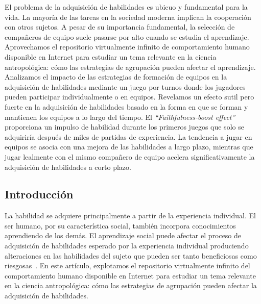 \documentclass[a4paper,10pt]{book}
\theoremstyle{definition}
\begin{document}
El problema de la adquisici\'on de habilidades es ubicuo y fundamental para la vida.
%
La mayor\'ia de las tareas en la sociedad moderna implican la cooperaci\'on con otros sujetos.
%
A pesar de su importancia fundamental, la selecci\'on de compañeros de equipo suele pasarse por alto cuando se estudia el aprendizaje.
%
Aprovechamos el repositorio virtualmente infinito de comportamiento humano disponible en Internet para estudiar un tema relevante en la ciencia antropol\'ogica: c\'omo las estrategias de agrupaci\'on pueden afectar el aprendizaje.
%
Analizamos el impacto de las estrategias de formaci\'on de equipos en la adquisici\'on de habilidades mediante un juego por turnos donde los jugadores pueden participar individualmente o en equipos.
%
Revelamos un efecto sutil pero fuerte en la adquisici\'on de habilidades basado en la forma en que se forman y mantienen los equipos a lo largo del tiempo.
%
El \emph{``Faithfulness-boost effect''} proporciona un impulso de habilidad durante los primeros juegos que solo se adquirir\'ia después de miles de partidas de experiencia.
%
La tendencia a jugar en equipos se asocia con una mejora de las habilidades a largo plazo, mientras que jugar lealmente con el mismo compañero de equipo acelera significativamente la adquisici\'on de habilidades a corto plazo.

\subsection{Introducci\'on}

La habilidad se adquiere principalmente a partir de la experiencia individual.
%
El ser humano, por su caracter\'istica social, también incorpora conocimientos aprendiendo de los demás.
%
El aprendizaje social puede afectar el proceso de adquisici\'on de habilidades esperado por la experiencia individual produciendo alteraciones en las habilidades del sujeto que pueden ser tanto beneficiosas como riesgosas~\cite{Boyd2011}.
%
En este art\'iculo, explotamos el repositorio virtualmente infinito del comportamiento humano disponible en Internet para estudiar un tema relevante en la ciencia antropol\'ogica: c\'omo las estrategias de agrupaci\'on pueden afectar la adquisici\'on de habilidades.

\end{document}
